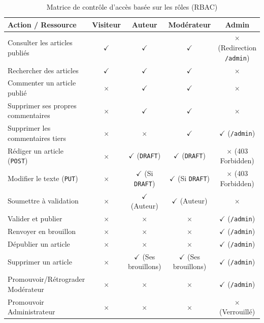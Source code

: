 \documentclass[11pt,a4paper]{article}
\begin{document}
\begin{table}[h!]
\centering
\scriptsize
\begin{tabular}{|l|c|c|c|c|}
\hline
\textbf{Action / Ressource} & \textbf{Visiteur} & \textbf{Auteur} & \textbf{Modérateur} & \textbf{Admin} \\
\hline
Consulter les articles publiés & $\checkmark$ & $\checkmark$ & $\checkmark$ & $\times$ (Redirection \texttt{/admin}) \\
Rechercher des articles & $\checkmark$ & $\checkmark$ & $\checkmark$ & $\times$ \\
Commenter un article publié & $\times$ & $\checkmark$ & $\checkmark$ & $\times$ \\
Supprimer ses propres commentaires & $\times$ & $\checkmark$ & $\checkmark$ & $\times$ \\
Supprimer les commentaires tiers & $\times$ & $\times$ & $\checkmark$ & $\checkmark$ (\texttt{/admin}) \\
Rédiger un article (\texttt{POST}) & $\times$ & $\checkmark$ (\texttt{DRAFT}) & $\checkmark$ (\texttt{DRAFT}) & $\times$ (403 Forbidden) \\
Modifier le texte (\texttt{PUT}) & $\times$ & $\checkmark$ (Si \texttt{DRAFT}) & $\checkmark$ (Si \texttt{DRAFT}) & $\times$ (403 Forbidden) \\
Soumettre à validation & $\times$ & $\checkmark$ (Auteur) & $\checkmark$ (Auteur) & $\times$ \\
Valider et publier & $\times$ & $\times$ & $\times$ & $\checkmark$ (\texttt{/admin}) \\
Renvoyer en brouillon & $\times$ & $\times$ & $\times$ & $\checkmark$ (\texttt{/admin}) \\
Dépublier un article & $\times$ & $\times$ & $\times$ & $\checkmark$ (\texttt{/admin}) \\
Supprimer un article & $\times$ & $\checkmark$ (Ses brouillons) & $\checkmark$ (Ses brouillons) & $\checkmark$ (\texttt{/admin}) \\
Promouvoir/Rétrograder Modérateur & $\times$ & $\times$ & $\times$ & $\checkmark$ (\texttt{/admin}) \\
Promouvoir Administrateur & $\times$ & $\times$ & $\times$ & $\times$ (Verrouillé) \\
\hline
\end{tabular}
\caption{Matrice de contrôle d'accès basée sur les rôles (RBAC)}
\label{tab:rbac}
\end{table}

\newpage
\end{document}
